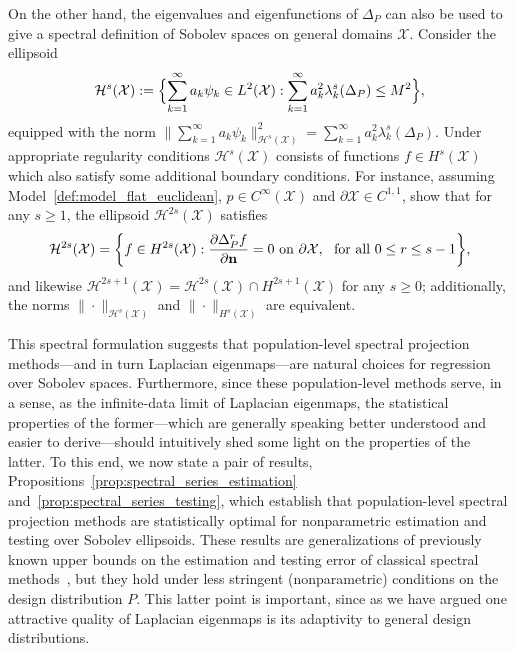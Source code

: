 \documentclass[aos]{imsart}
\theoremstyle{plain}
\theoremstyle{definition}
\theoremstyle{remark}
\newcommand{\mc}[1]{\mathcal{#1}}
\newcommand{\1}{\mathbf{1}}
\begin{document}
On the other hand, the eigenvalues and eigenfunctions of $\Delta_P$ can also be used to give a spectral definition of Sobolev spaces on general domains $\mc{X}$. Consider the ellipsoid
\begin{equation}
\label{eqn:sobolev_ellipsoid}
\mc{H}^{s}(\mc{X}) := \Bigl\{\sum_{k = 1}^{\infty} a_k \psi_k \in L^2(\mc{X}):  \sum_{k = 1}^{\infty} a_k^2 \lambda_{k}^s(\Delta_P) \leq M^2 \Bigr\},
\end{equation}
equipped with the norm $\|\sum_{k = 1}^{\infty} a_k \psi_k\|_{\mc{H}^s(\mc{X})}^2 = \sum_{k = 1}^{\infty} a_k^2 \lambda_{k}^s(\Delta_P)$. Under appropriate regularity conditions $\mc{H}^s(\mc{X})$ consists of functions $f \in H^s(\mc{X})$ which also satisfy some additional boundary conditions. For instance, assuming Model~\ref{def:model_flat_euclidean}, $p \in C^{\infty}(\mc{X})$ and $\partial \mc{X} \in C^{1,1}$, \citet{dunlop2020} show that for any $s \geq 1$, the ellipsoid $\mc{H}^{2s}(\mc{X})$ satisfies
\begin{equation}
\label{eqn:sobolev_ellipsoid_to_sobolev_ball}
\mc{H}^{2s}(\mc{X}) = 
\biggl\{f \in H^{2s}(\mc{X}): \frac{\partial \Delta_P^rf}{\partial {\bf n}} = 0~\textrm{on}~\partial\mc{X},~~\textrm{for all $0 \leq r \leq s - 1$} \biggr\},
\end{equation}
and likewise $\mc{H}^{2s + 1}(\mc{X}) = \mc{H}^{2s}(\mc{X}) \cap H^{2s + 1}(\mc{X})$ for any $s \geq 0$; additionally, the norms $\|\cdot\|_{\mc{H}^s(\mc{X})}$ and $\|\cdot\|_{H^s(\mc{X})}$ are equivalent.

This spectral formulation suggests that population-level spectral projection methods---and in turn Laplacian eigenmaps---are natural choices for regression over Sobolev spaces. Furthermore, since these population-level methods serve, in a sense, as the infinite-data limit of Laplacian eigenmaps, the statistical properties of the former---which are generally speaking better understood and easier to derive---should intuitively shed some light on the properties of the latter. To this end, we now state a pair of results, Propositions~\ref{prop:spectral_series_estimation} and~\ref{prop:spectral_series_testing}, which establish that population-level spectral projection methods are statistically optimal for nonparametric estimation and testing over Sobolev ellipsoids. These results are generalizations of previously known upper bounds on the estimation and testing error of classical spectral methods~\citep{tsybakov08,ingster2009}, but they hold under less stringent (nonparametric) conditions on the design distribution $P$. This latter point is important, since as we have argued one attractive quality of Laplacian eigenmaps is its adaptivity to general design distributions.
\end{document}
